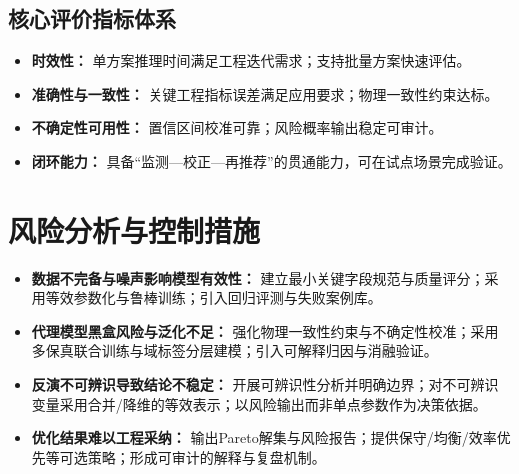 \documentclass[12pt,a4paper,fontset=mac]{ctexart}
\begin{document}
\subsection{核心评价指标体系}
\begin{itemize}
  \item \textbf{时效性：} 单方案推理时间满足工程迭代需求；支持批量方案快速评估。
  \item \textbf{准确性与一致性：} 关键工程指标误差满足应用要求；物理一致性约束达标。
  \item \textbf{不确定性可用性：} 置信区间校准可靠；风险概率输出稳定可审计。
  \item \textbf{闭环能力：} 具备“监测—校正—再推荐”的贯通能力，可在试点场景完成验证。
\end{itemize}

\section{风险分析与控制措施}

\begin{itemize}
  \item \textbf{数据不完备与噪声影响模型有效性：} 建立最小关键字段规范与质量评分；采用等效参数化与鲁棒训练；引入回归评测与失败案例库。
  \item \textbf{代理模型黑盒风险与泛化不足：} 强化物理一致性约束与不确定性校准；采用多保真联合训练与域标签分层建模；引入可解释归因与消融验证。
  \item \textbf{反演不可辨识导致结论不稳定：} 开展可辨识性分析并明确边界；对不可辨识变量采用合并/降维的等效表示；以风险输出而非单点参数作为决策依据。
  \item \textbf{优化结果难以工程采纳：} 输出Pareto解集与风险报告；提供保守/均衡/效率优先等可选策略；形成可审计的解释与复盘机制。
\end{itemize}

\clearpage
{}
{}


\end{document}

